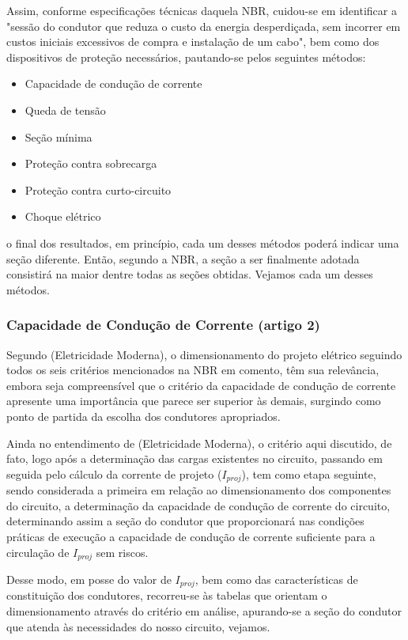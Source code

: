 Assim, conforme especificações técnicas daquela NBR, cuidou-se em identificar a "sessão do condutor que reduza o custo da energia desperdiçada, sem incorrer em custos iniciais excessivos de compra e instalação de um cabo", bem como dos dispositivos de proteção necessários, pautando-se pelos seguintes métodos:

\begin{itemize}
	\item Capacidade de condução de corrente
	\item Queda de tensão
	\item Seção mínima
	\item Proteção contra sobrecarga
	\item Proteção contra curto-circuito
	\item Choque elétrico
\end{itemize}

o final dos resultados, em princípio, cada um desses métodos poderá indicar uma seção diferente. Então, segundo a NBR, a seção a ser finalmente adotada consistirá na maior dentre todas as seções obtidas. Vejamos cada um desses métodos.

\subsubsection{Capacidade de Condução de Corrente (artigo 2)}

Segundo (Eletricidade Moderna), o dimensionamento do projeto elétrico seguindo todos os seis critérios mencionados na NBR em comento, têm sua relevância, embora seja compreensível que o critério da capacidade de condução de corrente apresente uma importância que parece ser superior às demais, surgindo como ponto de partida da escolha dos condutores apropriados.

Ainda no entendimento de (Eletricidade Moderna), o critério aqui discutido, de fato, logo após a determinação das cargas existentes no circuito, passando em seguida pelo cálculo da corrente de projeto ($I_{proj}$), tem como etapa seguinte, sendo considerada a primeira em relação ao dimensionamento dos componentes do circuito, a determinação da capacidade de condução de corrente do circuito, determinando assim a seção do condutor que proporcionará nas condições práticas de execução a capacidade de condução de corrente suficiente para a circulação de $I_{proj}$ sem riscos.

Desse modo, em posse do valor de $I_{proj}$, bem como das características de constituição dos condutores, recorreu-se às tabelas que orientam o dimensionamento através do critério em análise, apurando-se a seção do condutor que atenda às necessidades do nosso circuito, vejamos.

